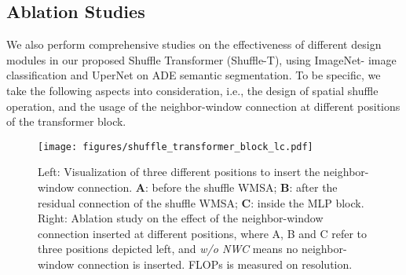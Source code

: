 \documentclass{article}
\begin{document}
\begin{table}
\caption{ Ablation study on different ways to spatial shuffle on two benchmarks. }
\label{tab:ab_long_range_shuffle}
\begin{center}
\end{center}
\vspace{-3mm}
\end{table}

\subsection{Ablation Studies}
We also perform comprehensive studies on the effectiveness of different design modules in our proposed Shuffle Transformer (Shuffle-T), using ImageNet- image classification and UperNet on ADE semantic segmentation. To be specific, we take the following aspects into consideration, i.e., the design of spatial shuffle operation, and the usage of the neighbor-window connection at different positions of the transformer block.

\begin{figure}
\begin{minipage}[b]{0.49\textwidth}
\centering
\texttt{[image: figures/shuffle\_transformer\_block\_lc.pdf]}
\end{minipage}
\begin{minipage}[b]{0.49\textwidth}
\centering
{}
\end{minipage}
\caption{Left: Visualization of three different positions to insert the neighbor-window connection. \textbf{A}: before the shuffle WMSA; \textbf{B}: after the residual connection of the shuffle WMSA; \textbf{C}: inside the MLP block. Right: Ablation study on the effect of the neighbor-window connection inserted at different positions, where A, B and C refer to three positions depicted left, and \textit{w/o NWC} means no neighbor-window connection is inserted. FLOPs is measured on  resolution.}
\label{fig:my_label}
\vspace{-3mm}
\end{figure}
\end{document}
